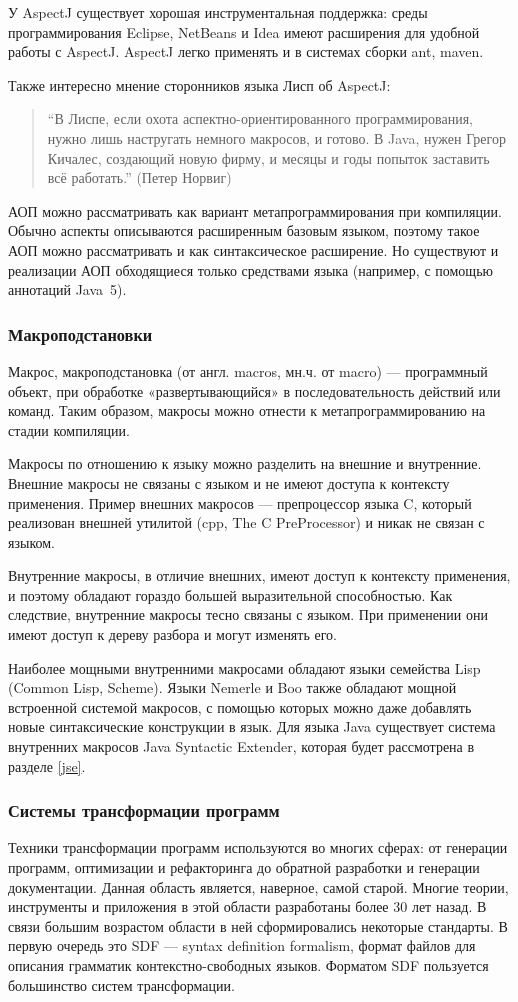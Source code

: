 \documentclass[a4paper,12pt,titlepage]{extarticle}
\begin{document}
У AspectJ существует хорошая инструментальная поддержка: среды программирования
Eclipse, NetBeans и Idea имеют расширения для удобной работы с AspectJ. AspectJ
легко применять и в системах сборки ant, maven.

Также интересно мнение сторонников языка Лисп об AspectJ:
\begin{quote}
``В Лиспе, если охота аспектно-ориентированного программирования, нужно лишь
настругать немного макросов, и готово. В Java, нужен Грегор Кичалес, создающий
новую фирму, и месяцы и годы попыток заставить всё работать.'' (Петер Норвиг)
\end{quote}

АОП можно рассматривать как вариант метапрограммирования при компиляции.
Обычно аспекты описываются расширенным базовым языком, поэтому такое АОП можно
рассматривать и как синтаксическое расширение. Но существуют и реализации АОП
обходящиеся только средствами языка (например, с помощью аннотаций Java~5).

\subsubsection*{Макроподстановки}
Макрос, макроподстановка (от англ. macros, мн.ч. от macro) — программный
объект, при обработке «развертывающийся» в последовательность действий или
команд. Таким образом, макросы можно отнести к метапрограммированию на стадии
компиляции.

Макросы по отношению к языку можно разделить на внешние и внутренние.
Внешние макросы не связаны с языком и не имеют доступа к контексту применения.
Пример внешних макросов --- препроцессор языка C, который реализован внешней
утилитой (cpp, The C PreProcessor) и никак не связан с языком.

Внутренние макросы, в отличие внешних, имеют доступ к контексту применения, и
поэтому обладают гораздо большей выразительной способностью. Как следствие,
внутренние макросы тесно связаны с языком. При применении они имеют доступ к
дереву разбора и могут изменять его.

Наиболее мощными внутренними макросами обладают языки семейства Lisp
(Common Lisp, Scheme). Языки Nemerle и Boo также обладают мощной встроенной
системой макросов, с помощью которых можно даже добавлять новые синтаксические
конструкции в язык. Для языка Java существует система внутренних макросов Java
Syntactic Extender, которая будет рассмотрена в разделе \ref{jse}.

\subsubsection*{Системы трансформации программ}
Техники трансформации программ используются во многих сферах: от генерации
программ, оптимизации и рефакторинга до обратной разработки и генерации
документации.
Данная область является, наверное, самой старой. Многие теории, инструменты и
приложения в этой области разработаны более 30 лет назад.
В связи большим возрастом области в ней сформировались некоторые стандарты.
В первую очередь это SDF \cite{sdf} --- syntax definition formalism, формат
файлов для описания грамматик контекстно-свободных языков. Форматом SDF пользуется
большинство систем трансформации.
\end{document}
